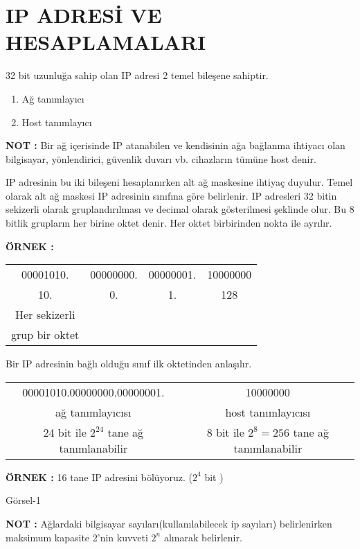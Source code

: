 \section{IP ADRESİ VE HESAPLAMALARI} %
32 bit uzunluğa sahip olan IP adresi 2 temel bileşene sahiptir. 

\begin{enumerate}
\item Ağ tanımlayıcı
\item Host tanımlayıcı
\end{enumerate}

\textbf{NOT : }Bir ağ içerisinde IP atanabilen ve kendisinin ağa bağlanma ihtiyacı olan bilgisayar, yönlendirici, güvenlik duvarı vb. cihazların tümüne host denir. 

IP adresinin bu iki bileşeni hesaplanırken alt ağ maskesine ihtiyaç duyulur. Temel olarak alt ağ maskesi IP adresinin sınıfına göre belirlenir. IP adresleri 32 bitin sekizerli olarak gruplandırılması ve decimal olarak gösterilmesi şeklinde olur. Bu 8 bitlik grupların her birine oktet denir. Her oktet birbirinden nokta ile ayrılır. 

\textbf{ÖRNEK : }
\begin{center}
\begin{tabular}{cccc}
00001010.&00000000.&00000001.&10000000 \\
10.       & 0.      & 1.      & 128      \\
Her sekizerli & & & \\
grup bir oktet & & &
\end{tabular}
\end{center}

Bir IP adresinin bağlı olduğu sınıf ilk oktetinden anlaşılır. 

\begin{center}
\begin{tabular}{cc}
00001010.00000000.00000001.&10000000 \\
ağ tanımlayıcısı           &  host tanımlayıcısı \\ 
24 bit ile $2^{24}$ tane ağ tanımlanabilir & 8 bit ile $2^8=256$ tane ağ tanımlanabilir\\
\end{tabular}
\end{center}

\textbf{ÖRNEK : } 16 tane IP adresini bölüyoruz. (${2^4}$ bit ) 

Görsel-1

\textbf{NOT : }Ağlardaki bilgisayar sayıları(kullanılabilecek ip sayıları) belirlenirken maksimum kapasite 2'nin kuvveti ${2^n}$ %
alınarak belirlenir. 

